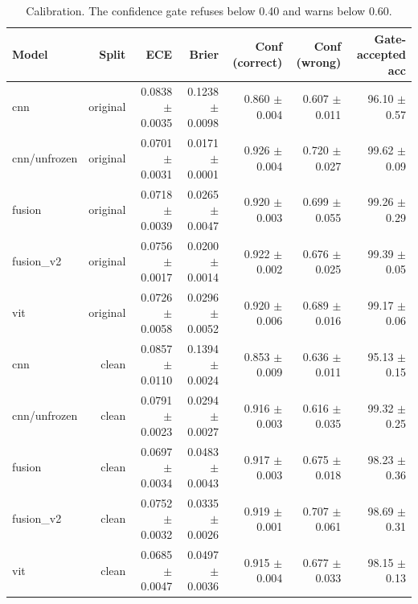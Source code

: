 \begin{table}[t]
\centering
\begin{tabular}{lrrrrrr}
\toprule
Model & Split & ECE & Brier & Conf (correct) & Conf (wrong) & Gate-accepted acc \\
\midrule
cnn & original & 0.0838 $\pm$ 0.0035 & 0.1238 $\pm$ 0.0098 & 0.860 $\pm$ 0.004 & 0.607 $\pm$ 0.011 & 96.10 $\pm$ 0.57 \\
cnn/unfrozen & original & 0.0701 $\pm$ 0.0031 & 0.0171 $\pm$ 0.0001 & 0.926 $\pm$ 0.004 & 0.720 $\pm$ 0.027 & 99.62 $\pm$ 0.09 \\
fusion & original & 0.0718 $\pm$ 0.0039 & 0.0265 $\pm$ 0.0047 & 0.920 $\pm$ 0.003 & 0.699 $\pm$ 0.055 & 99.26 $\pm$ 0.29 \\
fusion_v2 & original & 0.0756 $\pm$ 0.0017 & 0.0200 $\pm$ 0.0014 & 0.922 $\pm$ 0.002 & 0.676 $\pm$ 0.025 & 99.39 $\pm$ 0.05 \\
vit & original & 0.0726 $\pm$ 0.0058 & 0.0296 $\pm$ 0.0052 & 0.920 $\pm$ 0.006 & 0.689 $\pm$ 0.016 & 99.17 $\pm$ 0.06 \\
cnn & clean & 0.0857 $\pm$ 0.0110 & 0.1394 $\pm$ 0.0024 & 0.853 $\pm$ 0.009 & 0.636 $\pm$ 0.011 & 95.13 $\pm$ 0.15 \\
cnn/unfrozen & clean & 0.0791 $\pm$ 0.0023 & 0.0294 $\pm$ 0.0027 & 0.916 $\pm$ 0.003 & 0.616 $\pm$ 0.035 & 99.32 $\pm$ 0.25 \\
fusion & clean & 0.0697 $\pm$ 0.0034 & 0.0483 $\pm$ 0.0043 & 0.917 $\pm$ 0.003 & 0.675 $\pm$ 0.018 & 98.23 $\pm$ 0.36 \\
fusion_v2 & clean & 0.0752 $\pm$ 0.0032 & 0.0335 $\pm$ 0.0026 & 0.919 $\pm$ 0.001 & 0.707 $\pm$ 0.061 & 98.69 $\pm$ 0.31 \\
vit & clean & 0.0685 $\pm$ 0.0047 & 0.0497 $\pm$ 0.0036 & 0.915 $\pm$ 0.004 & 0.677 $\pm$ 0.033 & 98.15 $\pm$ 0.13 \\
\bottomrule
\end{tabular}
\caption{Calibration. The confidence gate refuses below 0.40 and warns below 0.60.}
\label{tab:calib}
\end{table}

